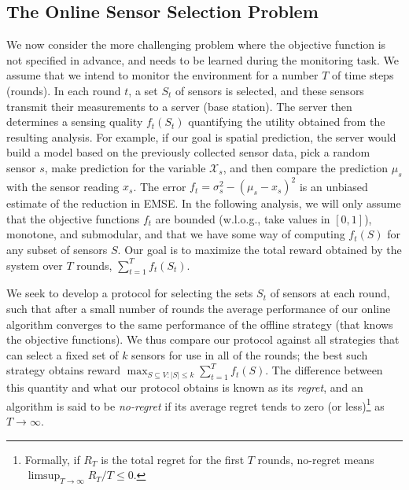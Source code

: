 \documentclass{sig-alternate-dan}
\numberwithin{equation}{section}
\newcommand{\sensors}{V}
\newcommand{\obj}{\ensuremath{f}} %
\newcommand{\K}{\ensuremath{k}}
\newcommand{\cX}{{\mathcal{X}}}
\begin{document}
\subsection{The Online Sensor Selection Problem}  \label{sec:online-problem}
%

%
%
%
%
We now consider the more challenging problem where the objective
function is not specified in advance, and needs to be learned during
the monitoring task.  We assume that we intend to monitor the
environment for a number $T$ of time steps (rounds).  In each round
$t$, a set $S_{t}$ of sensors is selected, and these sensors transmit
their measurements to a server (base station).
%
%
%
The server then determines a sensing quality $\obj_t(S_t)$
quantifying the utility obtained from the resulting analysis. For
example, if our goal is spatial prediction, the server would build a
model based on the previously collected sensor data, pick a random
sensor $s$, make prediction for the variable $\cX_{s}$, and then
compare the prediction $\mu_{s}$ with the sensor reading $x_{s}$.  The
error $\obj_{t}=\sigma_{s}^{2}-(\mu_{s}-x_{s})^{2}$ is an unbiased
estimate of the reduction in EMSE.  In the following analysis, we will
only assume that the objective functions $\obj_{t}$ are bounded (w.l.o.g., take values in
$[0,1]$), monotone, and submodular, and that we have some way of
computing $\obj_{t}(S)$ for any subset of sensors $S$.
%
%
%
%
%
%
Our goal is to maximize the total reward obtained by the system 
over $T$ rounds, $\sum_{t=1}^T \obj_t(S_t)$.
%
%

%
%
%

%
%
%
%
%
%
%
%
%
%

%
%
%
%
%


We seek to develop a protocol for selecting the sets $S_{t}$ of
sensors at each round, such that after a small number of rounds the
average performance of our online algorithm converges to the same
performance of the offline strategy (that knows the objective
functions).  We thus compare our protocol against all strategies that
can select a fixed set of $\K$ sensors for use in all of the rounds;
the best such strategy obtains reward $\max_{S \subseteq \sensors: |S|
\le \K} \sum_{t=1}^T \obj_t(S)$.  The difference between this quantity
and what our protocol obtains is known as its \emph{regret}, and an
algorithm is said to be \emph{no-regret} if its average regret tends to zero (or less)\footnote{Formally, if $R_T$ is the
  total regret for the first $T$ rounds, no-regret means 
$\limsup_{T \to \infty} R_T/T \le 0$.} as $T \to \infty$.
%
%
\end{document}

